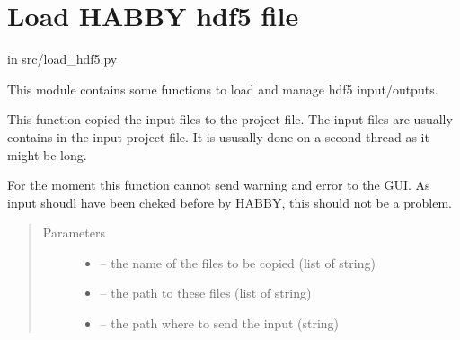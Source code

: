 \documentclass[letterpaper,10pt,english]{sphinxmanual}
\begin{document}
\section{Load HABBY hdf5 file}
\label{\detokenize{index:load-habby-hdf5-file}}
in src/load\_hdf5.py

This module contains some functions to load and manage hdf5 input/outputs.
\label{\detokenize{index:module-src.load_hdf5}}

\begin{fulllineitems}
\label{\detokenize{index:src.load_hdf5.copy_files}}
This function copied the input files to the project file. The input files are usually contains in the input
project file. It is ususally done on a second thread as it might be long.

For the moment this function cannot send warning and error to the GUI. As input shoudl have been cheked before
by HABBY, this should not be a problem.
\begin{quote}\begin{description}
\item[{Parameters}] \leavevmode\begin{itemize}
\item {} 
 -- the name of the files to be copied (list of string)

\item {} 
 -- the path to these files (list of string)

\item {} 
 -- the path where to send the input (string)

\end{itemize}

\end{description}\end{quote}

\end{fulllineitems}

\end{document}
